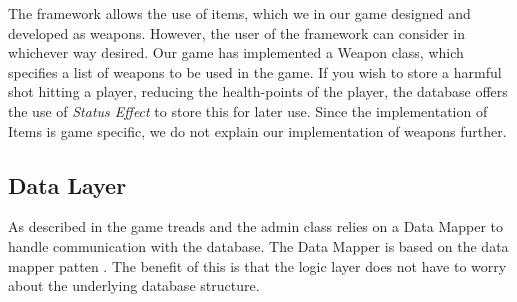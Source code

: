 The framework allows the use of items, which we in our game designed and developed as weapons. However, the user of the framework can consider in whichever way desired. Our game has implemented a Weapon class, which specifies a list of weapons to be used in the game. If you wish to store a harmful shot hitting a player, reducing the health-points of the player, the database offers the use of \textit{Status Effect} to store this for later use. Since the implementation of Items is game specific, we do not explain our implementation of weapons further.







\subsection{Data Layer}
As described in  the game treads and the admin class relies on a Data Mapper to handle communication with the database. The Data Mapper is based on the data mapper patten . The benefit of this is that the logic layer does not have to worry about the underlying database structure.
